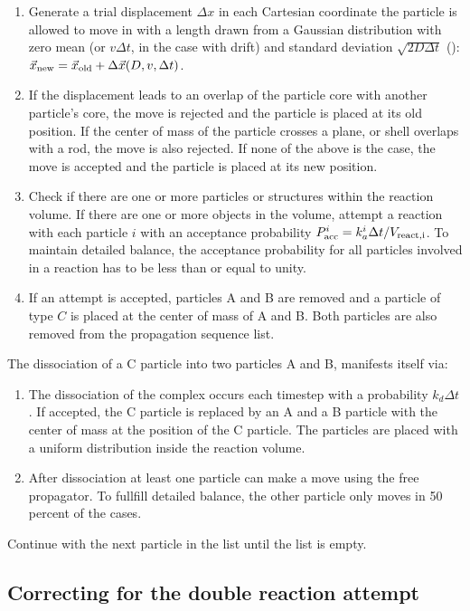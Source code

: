 \begin{enumerate}
\item Generate a trial displacement $\Delta x$ in each Cartesian coordinate the particle is allowed to move in with a length drawn from a Gaussian distribution with zero mean (or $v \Delta t$, in the case with drift) and standard deviation $\sqrt{2D\Delta t}$ (): $\vec{x}_{\rm new} = \vec{x}_{\rm old} + \Delta \vec{x}(D,v,\Delta t)$.
\item If the displacement leads to an overlap of the particle core with another particle's core, the move is rejected and the particle is placed at its old position. If the center of mass of the particle crosses a plane, or shell overlaps with a rod, the move is also rejected. If none of the above is the case, the move is accepted and the particle is placed at its new position.
\item Check if there are one or more particles or structures within the reaction volume. If there are one or more objects in the volume, attempt a reaction with each particle $i$ with an acceptance probability $P_{\rm acc}^i = k_{a}^i \Delta t/V_{\rm react, i}$. To maintain detailed balance, the acceptance probability for all particles involved in a reaction has to be less than or equal to unity. 
\item If an attempt is accepted, particles A and B are removed and a particle of type $C$ is placed at the center of mass of A and B. Both particles are also removed from the propagation sequence list. 
\end{enumerate}

The dissociation of a C particle into two particles A and B, manifests itself via:

\begin{enumerate}
\item The dissociation of the complex occurs each timestep with a probability $k_d \Delta t$. If accepted, the C particle is replaced by an A and a B particle with the center of mass at the position of the C particle. The particles are placed with a uniform distribution inside the reaction volume.
\item After dissociation at least one particle can make a move using the free propagator. To fullfill detailed balance, the other particle only moves in 50 percent of the cases. 
\end{enumerate}
Continue with the next particle in the list until the list is empty.


\subsection{Correcting for the double reaction attempt}

